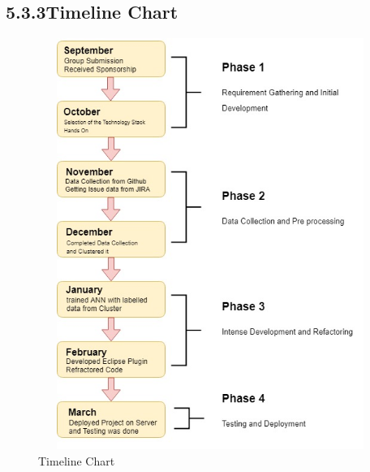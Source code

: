 \documentclass[oneside,a4paper,12pt]{book}
\begin{document}
\subsection*{5.3.3\hspace*{10pt}Timeline Chart}
\begin{Center}



\begin{figure}[H]
	\begin{Center}
		\includegraphics[width=5.43in,height=5.27in]{gc.jpg}
		\caption{Timeline Chart}
		\label{fig:Timeline_Chart}
	\end{Center}
\end{figure}

\end{Center}\par
\newpage
\end{document}
